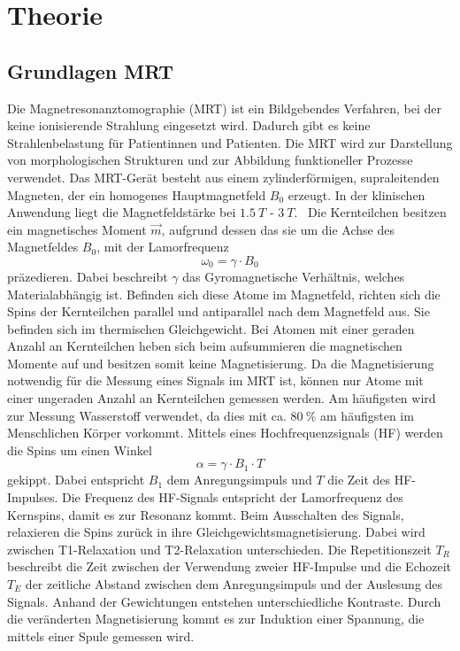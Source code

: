 \chapter{Theorie}
\section{Grundlagen MRT}
Die Magnetresonanztomographie (MRT) ist ein Bildgebendes Verfahren, bei der keine ionisierende Strahlung eingesetzt wird.
Dadurch gibt es keine Strahlenbelastung für Patientinnen und Patienten.
Die MRT wird zur Darstellung von morphologischen Strukturen und zur Abbildung funktioneller Prozesse verwendet.
Das MRT-Gerät besteht aus einem zylinderförmigen, supraleitenden Magneten, der ein homogenes Hauptmagnetfeld $B_0$ erzeugt. %
In der klinischen Anwendung liegt die Magnetfeldstärke bei $\qty{1.5}{T}$ - $\qty{3}{T}$.~\cite{Schlegel}
Die Kernteilchen besitzen ein magnetisches Moment $\vec{m}$, aufgrund dessen das sie um die Achse des Magnetfeldes $B_0$, mit der Lamorfrequenz 
\begin{equation}
    \omega_0 = \gamma \cdot B_0
\end{equation}
präzedieren. Dabei beschreibt $\gamma$ das Gyromagnetische Verhältnis, welches Materialabhängig ist.
Befinden sich diese Atome im Magnetfeld,
richten sich die Spins der Kernteilchen parallel und antiparallel nach dem Magnetfeld aus. Sie befinden sich im thermischen Gleichgewicht.
Bei Atomen mit einer geraden Anzahl an Kernteilchen heben sich beim aufsummieren die magnetischen Momente auf und besitzen somit keine
Magnetisierung. 
Da die Magnetisierung notwendig für die Messung eines Signals im MRT ist, können nur Atome mit einer ungeraden Anzahl an Kernteilchen gemessen werden.
Am häufigsten wird zur Messung Wasserstoff verwendet, da dies mit ca. $\qty{80}{\%}$ am häufigsten im Menschlichen Körper vorkommt.
Mittels eines Hochfrequenzsignals (HF) werden die Spins um einen Winkel
\begin{equation}
    \alpha = \gamma \cdot B_1 \cdot T 
\end{equation}
gekippt. Dabei entspricht $B_1$ dem Anregungsimpuls und $T$ die Zeit des HF-Impulses.
Die Frequenz des HF-Signals entspricht der Lamorfrequenz des Kernspins, damit es zur Resonanz kommt. 
Beim Ausschalten des Signals, relaxieren die Spins zurück in ihre Gleichgewichtsmagnetisierung. 
Dabei wird zwischen T1-Relaxation und T2-Relaxation unterschieden. 
Die Repetitionszeit $T_R$ beschreibt die Zeit zwischen der Verwendung zweier HF-Impulse und die Echozeit $T_E$ der zeitliche Abstand zwischen dem Anregungsimpuls und der Auslesung des Signals. 
Anhand der Gewichtungen entstehen unterschiedliche Kontraste.
Durch die veränderten Magnetisierung kommt es zur Induktion einer Spannung, die mittels einer Spule gemessen wird.~\cite{Pollmann}

